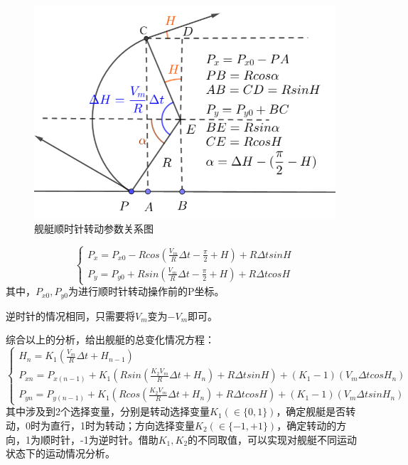 \documentclass[12pt]{article}%
\begin{document}
\begin{figure}[htb]
\centering
\includegraphics[width=12cm]{TIM20180527231733.png}
\caption{\heiti 舰艇顺时针转动参数关系图}
\label{fig:label2}
\end{figure}
\begin{equation}\label{jiantingzhuanweizhi}
\left\{ 
\begin{array}{c}
P_x=P_{x0}-Rcos\left(\frac{V_m}{R}\Delta t-\frac{\pi}{2}+H\right)+R\Delta tsinH\\
P_y=P_{y0}+Rsin\left(\frac{V_m}{R}\Delta t-\frac{\pi}{2}+H\right)+R\Delta tcosH
\end{array} \right. 
\end{equation}
其中，$P_{x0},P_{y0}$为进行顺时针转动操作前的P坐标。

逆时针的情况相同，只需要将$V_m$变为$-V_m$即可。

综合以上的分析，给出舰艇的总变化情况方程：
\begin{equation}\label{jiantingzongfangcheng}
\left\{ 
\begin{array}{c}
H_n=K_1(\frac{V_m}{R}\Delta t+H_{n-1})\\
P_{xn}=P_{x(n-1)}+K_1(Rsin\left(\frac{K_2V_m}{R}\Delta t+H_n\right)+R\Delta tsinH)+(K_1-1)(V_m\Delta tcosH_n)\\
P_{yn}=P_{y(n-1)}+K_1(Rcos\left(\frac{K_2V_m}{R}\Delta t+H_n\right)+R\Delta tcosH)+(K_1-1)(V_m\Delta tsinH_n)
\end{array} \right. 
\end{equation}
其中涉及到2个选择变量，分别是转动选择变量$K_1(\in \{0,1\})$，确定舰艇是否转动，0时为直行，1时为转动；方向选择变量$K_2(\in\{-1,+1\})$，确定转动的方向，1为顺时针，-1为逆时针。借助$K_1,K_2$的不同取值，可以实现对舰艇不同运动状态下的运动情况分析。
\end{document}
